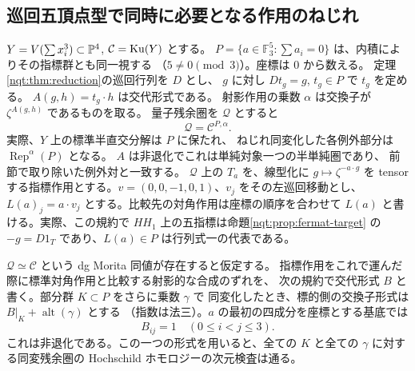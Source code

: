 \subsection{巡回五頂点型で同時に必要となる作用のねじれ}
\label{nqs:sec:coherence}
$Y=V(\sum x_i^3)\subset\mathbb P^4$, $\mathcal C=\operatorname{Ku}(Y)$ とする。
$P=\{a\in\mathbb F_3^5:\sum a_i=0\}$ は、内積によりその指標群とも同一視する
（$5\ne0\pmod3$）。座標は $0$ から数える。
定理\ref{nqt:thm:reduction}の巡回行列を $D$ とし、
$g$ に対し $Dt_g=g$, $t_g\in P$ で $t_g$ を定める。
$A(g,h)=t_g\cdot h$ は交代形式である。
射影作用の乗数 $\alpha$ は交換子が $\zeta^{A(g,h)}$ であるものを取る。
量子残余圏を $\mathcal Q$ とすると
\[
 \mathcal Q=\mathcal C^{P,\alpha}.
\]
実際、$Y$ 上の標準半直交分解は $P$ に保たれ、
ねじれ同変化した各例外部分は $\operatorname{Rep}^\alpha(P)$ となる。
$A$ は非退化でこれは単純対象一つの半単純圏であり、
前節で取り除いた例外対と一致する。
$\mathcal Q$ 上の $T_a$ を、線型化に $g\mapsto\zeta^{-a\cdot g}$ を
tensor する指標作用とする。$v=(0,0,-1,0,1)$、$v_j$ をその左巡回移動とし、
$L(a)_j=a\cdot v_j$ とする。比較先の対角作用は座標の順序を合わせて $L(a)$
と書ける。実際、この規約で $HH_1$ 上の五指標は命題\ref{nqt:prop:fermat-target}
の $-g=D1_T$ であり、$L(a)\in P$ は行列式一の代表である。

\begin{proposition}\label{nqs:prop:plane-coherence}
$\mathcal Q\simeq\mathcal C$ という dg Morita 同値が存在すると仮定する。
指標作用をこれで運んだ際に標準対角作用と比較する射影的な合成のずれを、
次の規約で交代形式 $B$ と書く。部分群 $K\subset P$ をさらに乗数 $\gamma$ で
同変化したとき、標的側の交換子形式は $B|_K+\operatorname{alt}(\gamma)$ とする
（指数は法三）。$a$ の最初の四成分を座標とする基底では
\[
 B_{ij}=1\quad(0\le i<j\le3).
\]
これは非退化である。この一つの形式を用いると、全ての $K$ と全ての
$\gamma$ に対する同変残余圏の Hochschild ホモロジーの次元検査は通る。
\end{proposition}

